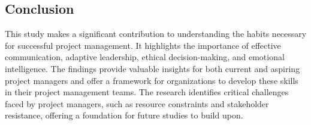 \documentclass{article}
\begin{document}
\subsection{Conclusion}
This study makes a significant contribution to understanding the habits necessary for successful project management. It highlights the importance of effective communication, adaptive leadership, ethical decision-making, and emotional intelligence. The findings provide valuable insights for both current and aspiring project managers and offer a framework for organizations to develop these skills in their project management teams. The research identifies critical challenges faced by project managers, such as resource constraints and stakeholder resistance, offering a foundation for future studies to build upon\cite{relationship_between_project_manage}.


\newpage
\end{document}
